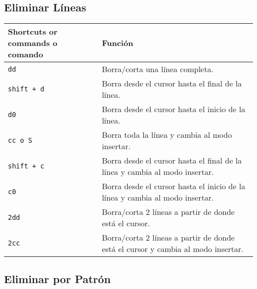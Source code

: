 \documentclass[
  doc,
  floatsintext,
  longtable,
  a4paper,
  nolmodern,
  notxfonts,
  notimes,
  colorlinks=true,linkcolor=blue,citecolor=blue,urlcolor=blue]{apa7}
\begin{document}
\subsection{Eliminar Líneas}\label{eliminar-luxedneas}

\begin{longtable}[]{@{}
  >{\raggedright\arraybackslash}p{}
  >{\raggedright\arraybackslash}p{}@{}}
\toprule\noalign{}
\begin{minipage}[b]{\linewidth}\raggedright
Shortcuts or commands o comando
\end{minipage} & \begin{minipage}[b]{\linewidth}\raggedright
Función
\end{minipage} \\
\midrule\noalign{}
\endhead
\bottomrule\noalign{}
\endlastfoot
\texttt{dd} & Borra/corta una línea completa. \\
\texttt{shift\ +\ d} & Borra desde el cursor hasta el final de la
línea. \\
\texttt{d0} & Borra desde el cursor hasta el inicio de la línea. \\
\texttt{cc\ o\ S} & Borra toda la línea y cambia al modo insertar. \\
\texttt{shift\ +\ c} & Borra desde el cursor hasta el final de la línea
y cambia al modo insertar. \\
\texttt{c0} & Borra desde el cursor hasta el inicio de la línea y cambia
al modo insertar. \\
\texttt{2dd} & Borra/corta 2 líneas a partir de donde está el cursor. \\
\texttt{2cc} & Borra/corta 2 líneas a partir de donde está el cursor y
cambia al modo insertar. \\
\end{longtable}

\subsection{Eliminar por Patrón}\label{eliminar-por-patruxf3n}
\end{document}

